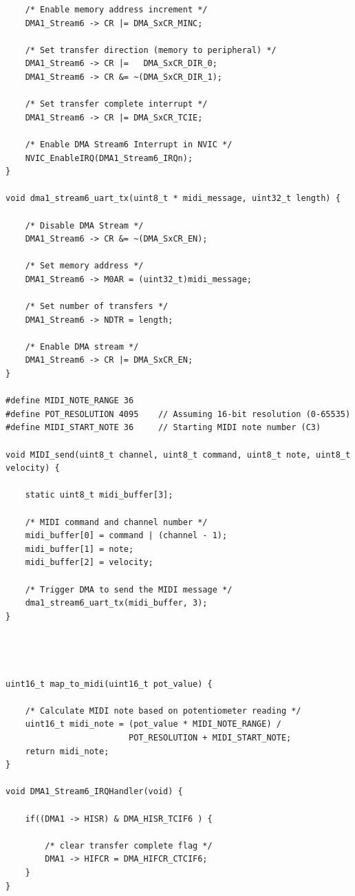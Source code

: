\documentclass[12pt]{article}
\numberwithin{subsubsubsection}{subsubsection}
\begin{document}
\begin{verbatim}
    /* Enable memory address increment */
    DMA1_Stream6 -> CR |= DMA_SxCR_MINC;
    
    /* Set transfer direction (memory to peripheral) */
    DMA1_Stream6 -> CR |=   DMA_SxCR_DIR_0;
    DMA1_Stream6 -> CR &= ~(DMA_SxCR_DIR_1);
    
    /* Set transfer complete interrupt */
    DMA1_Stream6 -> CR |= DMA_SxCR_TCIE;
    
    /* Enable DMA Stream6 Interrupt in NVIC */
    NVIC_EnableIRQ(DMA1_Stream6_IRQn);
}

void dma1_stream6_uart_tx(uint8_t * midi_message, uint32_t length) {
    
    /* Disable DMA Stream */
    DMA1_Stream6 -> CR &= ~(DMA_SxCR_EN);
    
    /* Set memory address */
    DMA1_Stream6 -> M0AR = (uint32_t)midi_message;
    
    /* Set number of transfers */
    DMA1_Stream6 -> NDTR = length;
    
    /* Enable DMA stream */
    DMA1_Stream6 -> CR |= DMA_SxCR_EN;
}

#define MIDI_NOTE_RANGE 36
#define POT_RESOLUTION 4095    // Assuming 16-bit resolution (0-65535)
#define MIDI_START_NOTE 36     // Starting MIDI note number (C3)

void MIDI_send(uint8_t channel, uint8_t command, uint8_t note, uint8_t velocity) {
	
    static uint8_t midi_buffer[3];
    
    /* MIDI command and channel number */
    midi_buffer[0] = command | (channel - 1);  
    midi_buffer[1] = note;
    midi_buffer[2] = velocity;
    
    /* Trigger DMA to send the MIDI message */
    dma1_stream6_uart_tx(midi_buffer, 3);
}




uint16_t map_to_midi(uint16_t pot_value) {

    /* Calculate MIDI note based on potentiometer reading */
    uint16_t midi_note = (pot_value * MIDI_NOTE_RANGE) / 
                         POT_RESOLUTION + MIDI_START_NOTE;
    return midi_note;
}

void DMA1_Stream6_IRQHandler(void) {

    if((DMA1 -> HISR) & DMA_HISR_TCIF6 ) {
    
        /* clear transfer complete flag */
        DMA1 -> HIFCR = DMA_HIFCR_CTCIF6; 
    }
}
\end{verbatim}
\newpage
\end{document}

